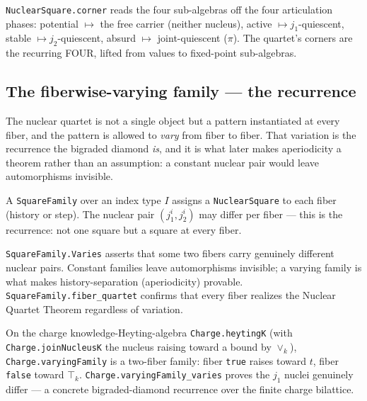 \begin{definition}\label{def:quartet-corner}\leanok{}
\texttt{NuclearSquare.corner} reads the four sub-algebras off the four articulation phases: potential $\mapsto$ the free carrier (neither nucleus), active $\mapsto j_1$-quiescent, stable $\mapsto j_2$-quiescent, absurd $\mapsto$ joint-quiescent ($\pi$). The quartet's corners are the recurring FOUR, lifted from values to fixed-point sub-algebras.
\end{definition}

\subsection{The fiberwise-varying family --- the recurrence}

The nuclear quartet is not a single object but a pattern instantiated at every fiber, and the pattern is allowed to \emph{vary} from fiber to fiber. That variation is the recurrence the bigraded diamond \emph{is}, and it is what later makes aperiodicity a theorem rather than an assumption: a constant nuclear pair would leave automorphisms invisible.

\begin{definition}\label{def:square-family}\leanok{}
A \texttt{SquareFamily} over an index type $I$ assigns a \texttt{NuclearSquare} to each fiber (history or step). The nuclear pair $(j_1^i, j_2^i)$ may differ per fiber --- this is the recurrence: not one square but a square at every fiber.
\end{definition}

\begin{definition}\label{def:varies}\leanok{}
\texttt{SquareFamily.Varies} asserts that some two fibers carry genuinely different nuclear pairs. Constant families leave automorphisms invisible; a varying family is what makes history-separation (aperiodicity) provable. \texttt{SquareFamily.fiber\_quartet} confirms that every fiber realizes the Nuclear Quartet Theorem regardless of variation.
\end{definition}

\begin{example}\label{ex:varying-family}\leanok{}
On the charge knowledge-Heyting-algebra \texttt{Charge.heytingK} (with \texttt{Charge.joinNucleusK} the nucleus raising toward a bound by $\vee_k$), \texttt{Charge.varyingFamily} is a two-fiber family: fiber \texttt{true} raises toward $t$, fiber \texttt{false} toward $\top_k$. \texttt{Charge.varyingFamily\_varies} proves the $j_1$ nuclei genuinely differ --- a concrete bigraded-diamond recurrence over the finite charge bilattice.
\end{example}

